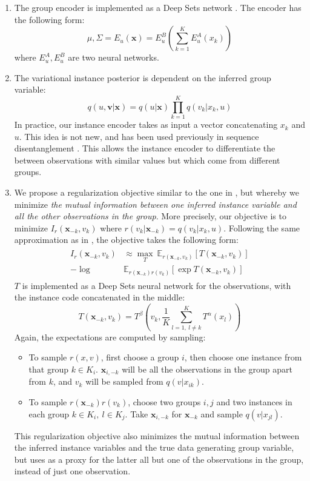 \documentclass[nohyperref]{article}
\theoremstyle{plain}
\theoremstyle{definition}
\theoremstyle{remark}
\begin{document}
\begin{enumerate}
    \item The group encoder is implemented as a Deep Sets network \citep{Zaheer2017DeepS}. The encoder has the following form:
    $$\mu, \Sigma = E_u (\mathbf{x}) = E^B_u \left( \sum_{k=1}^K E^A_u (x_k)\right)$$
    where $E^A_u, E^B_u$ are two neural networks.
    \item The variational instance posterior is dependent on the inferred group variable:
    $$q(u, \mathbf{v} | \mathbf{x}) = q(u | \mathbf{x}) \prod_{k=1}^K q(v_k | x_k, u)$$
    In practice, our instance encoder takes as input a vector concatenating $x_k$ and $u$. This idea is not new, and has been used previously in sequence disentanglement \citep{Li2018DisentangledSA}. This allows the instance encoder to differentiate the between observations with similar values but which come from different groups.
    \item We propose a regularization objective similar to the one in \citet{Nmeth2020AdversarialDW}, but whereby we minimize \textit{the mutual information between one inferred instance variable and all the other observations in the group}. More precisely, our objective is to minimize $I_r (\mathbf{x}_{-k}, v_k)$ where $r(v_k | \mathbf{x}_{-k}) = q(v_k | x_k, u)$. Following the same approximation as in \citet{Nmeth2020AdversarialDW}, the objective takes the following form:
    \begin{align}
        \begin{split}
            I_{r} (\mathbf{x}_{-k}, v_k) &\approx \max_{T} ~ \mathbb{E}_{r(\mathbf{x}_{-k}, v_k)} [T(\mathbf{x}_{-k}, v_k)] \\ - \log &\mathbb{E}_{r(\mathbf{x}_{-k}) r(v_k)} [\exp T(\mathbf{x}_{-k}, v_k)]
        \end{split}
    \end{align}
    $T$ is implemented as a Deep Sets neural network for the observations, with the instance code concatenated in the middle:
    $$T(\mathbf{x}_{-k}, v_k) = T^\beta \left(v_k, \frac{1}{K} \sum_{l=1, ~ l \neq k}^K T^\alpha (x_l) \right)$$
    Again, the expectations are computed by sampling:
    \begin{itemize}
        \item To sample $r(x, v)$, first choose a group $i$, then choose one instance from that group $k \in K_i$. $\mathbf{x}_{i,-k}$ will be all the observations in the group apart from $k$, and $v_k$ will be sampled from $q(v | x_{ik})$.
        \item To sample $r(\mathbf{x}_{-k})r(v_k)$, choose two groups $i, j$ and two instances in each group $k \in K_i, ~ l \in K_j$. Take $\mathbf{x}_{i, -k}$ for $\mathbf{x}_{-k}$ and sample $q(v | x_{jl})$. 
    \end{itemize}
    
    This regularization objective also minimizes the mutual information between the inferred instance variables and the true data generating group variable, but uses as a proxy for the latter all but one of the observations in the group, instead of just one observation.
\end{enumerate}
\end{document}
